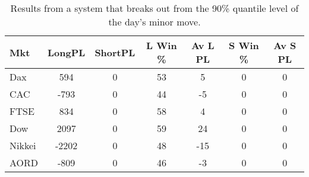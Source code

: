 \begin{table}[ht]
\centering
\caption[Results from a break out system using the day's the minor move]{Results from a system that breaks out from the 90\% quantile level of the day's minor move.} 
\label{tab:q_90_results}
\begin{tabular}{lcccccc}
  \toprule Mkt & LongPL & ShortPL & L Win \% & Av L PL & S Win \% & Av S PL \\ 
  \midrule Dax & 594 & 0 & 53 & 5 & 0 & 0 \\ 
  CAC & -793 & 0 & 44 & -5 & 0 & 0 \\ 
  FTSE & 834 & 0 & 58 & 4 & 0 & 0 \\ 
  Dow & 2097 & 0 & 59 & 24 & 0 & 0 \\ 
  Nikkei & -2202 & 0 & 48 & -15 & 0 & 0 \\ 
  AORD & -809 & 0 & 46 & -3 & 0 & 0 \\ 
   \bottomrule \end{tabular}
\end{table}
